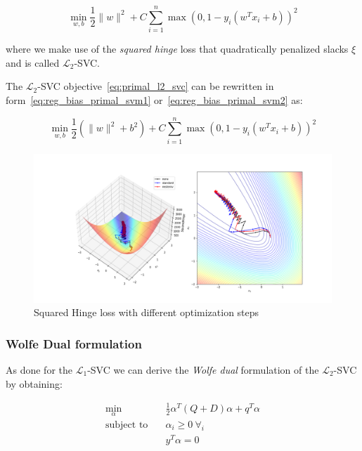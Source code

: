 \begin{equation} \label{eq:primal_l2_svc}
    \min_{w,b} \frac{1}{2} \| w \|^2 + C \sum_{i=1}^n \max(0, 1 - y_i (w^T x_i + b))^2
\end{equation}

where we make use of the \emph{squared hinge} loss that quadratically penalized slacks $\xi$ and is called $\mathcal{L}_2$-SVC.

The $\mathcal{L}_2$-SVC objective~\eqref{eq:primal_l2_svc} can be rewritten in form~\eqref{eq:reg_bias_primal_svm1} or~\eqref{eq:reg_bias_primal_svm2} as:

\begin{equation} \label{eq:reg_bias_primal_l2_svc}
    \min_{w,b} \frac{1}{2} (\| w \|^2 + b^2) + C \sum_{i=1}^n \max(0, 1 - y_i (w^T x_i + b))^2
\end{equation}

\begin{figure}[h!]
	\centering
  	\includegraphics[scale=0.4]{img/l2_svc_loss}
  	\caption{Squared Hinge loss with different optimization steps}
  	\label{fig:l2_svc_loss}
\end{figure}

\subsubsection{Wolfe Dual formulation}

As done for the $\mathcal{L}_1$-SVC we can derive the \emph{Wolfe dual} formulation of the $\mathcal{L}_2$-SVC by obtaining:

\begin{equation} \label{eq:wolfe_dual_l2_svc}
    \begin{aligned}
        \min_{\alpha} \quad & \frac{1}{2}\alpha^T (Q + D)\alpha+q^T\alpha \\
            \text{subject to} \quad & \alpha_i\geq 0 \ \forall_i \\ & y^T\alpha=0
    \end{aligned}
\end{equation}

